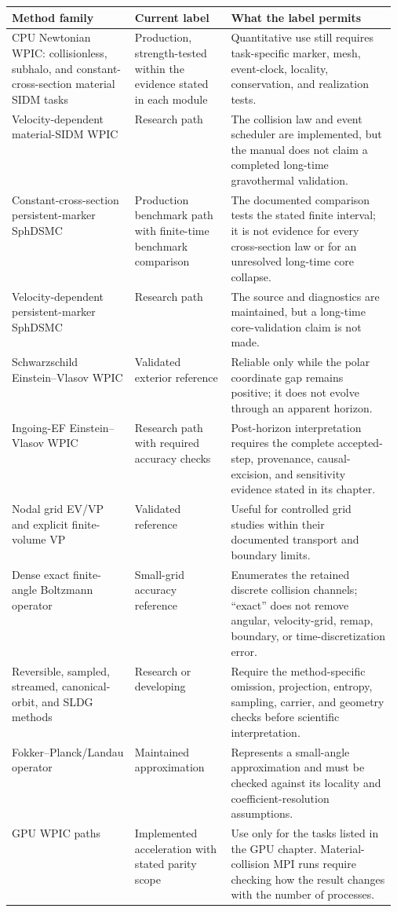 \begin{center}
\small
\begin{tabularx}{\linewidth}{@{}p{0.32\linewidth}p{0.25\linewidth}X@{}}
\toprule
Method family & Current label & What the label permits \\
\midrule
CPU Newtonian WPIC: collisionless, subhalo, and constant-cross-section
material SIDM tasks & Production, strength-tested within the evidence stated
in each module & Quantitative use still requires task-specific marker, mesh,
event-clock, locality, conservation, and realization tests. \\
Velocity-dependent material-SIDM WPIC & Research path & The collision law and
event scheduler are implemented, but the manual does not claim a completed
long-time gravothermal validation. \\
Constant-cross-section persistent-marker SphDSMC & Production benchmark path
with finite-time benchmark comparison & The documented comparison tests the stated
finite interval; it is not evidence for every cross-section law or for an
unresolved long-time core collapse. \\
Velocity-dependent persistent-marker SphDSMC & Research path & The source and
diagnostics are maintained, but a long-time core-validation claim is not made. \\
Schwarzschild Einstein--Vlasov WPIC & Validated exterior reference & Reliable
only while the polar coordinate gap remains positive; it does not evolve
through an apparent horizon. \\
Ingoing-EF Einstein--Vlasov WPIC & Research path with required
accuracy checks & Post-horizon interpretation requires the complete accepted-
step, provenance, causal-excision, and sensitivity evidence stated in its
chapter. \\
Nodal grid EV/VP and explicit finite-volume VP & Validated reference & Useful
for controlled grid studies within their documented transport and boundary
limits. \\
Dense exact finite-angle Boltzmann operator & Small-grid accuracy reference & Enumerates
the retained discrete collision channels; ``exact'' does not remove angular,
velocity-grid, remap, boundary, or time-discretization error. \\
Reversible, sampled, streamed, canonical-orbit, and SLDG methods & Research or
developing & Require the method-specific omission, projection, entropy,
sampling, carrier, and geometry checks before scientific interpretation. \\
Fokker--Planck/Landau operator & Maintained approximation & Represents a
small-angle approximation and must be checked against its locality and
coefficient-resolution assumptions. \\
GPU WPIC paths & Implemented acceleration with stated parity scope & Use only
for the tasks listed in the GPU chapter. Material-collision MPI runs
require checking how the result changes with the number of processes. \\
\bottomrule
\end{tabularx}
\end{center}

